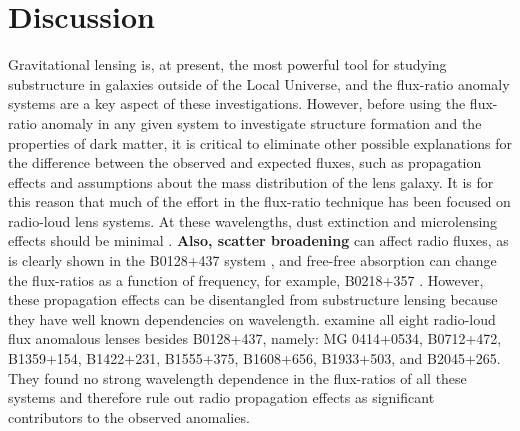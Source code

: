 \documentclass[useAMS,usenatbib]{mn2e}
\begin{document}
\section{Discussion}

Gravitational lensing is, at present, the most powerful tool for
studying substructure in galaxies outside of the Local Universe, and
the flux-ratio anomaly systems are a key aspect of these
investigations.  However, before using the flux-ratio anomaly in any
given system to investigate structure formation and the properties of
dark matter, it is critical to eliminate other possible explanations
for the difference between the observed and expected fluxes, such as
propagation effects and assumptions about the mass distribution of the
lens galaxy.  It is for this reason that much of the effort in the
flux-ratio technique has been focused on radio-loud lens systems.  At
these wavelengths, dust extinction and microlensing effects should be
minimal \citep[although see][for a rare example of radio
  microlensing]{K2000}.  \textbf{Also,  scatter broadening} can affect radio
fluxes, as is clearly shown in the B0128+437 system \citep{B04}, and free-free absorption can change the flux-ratios as a function of frequency,
for example, B0218+357 \citep{M07}.
However, these propagation effects can be disentangled from
substructure lensing because they have well known dependencies on
wavelength. \citet{KD04} examine all eight radio-loud flux anomalous
lenses besides B0128+437, namely: MG 0414+0534, B0712+472, B1359+154,
B1422+231, B1555+375, B1608+656, B1933+503, and B2045+265.  They found
no strong wavelength dependence in the flux-ratios of all these
systems and therefore rule out radio propagation effects as
significant contributors to the observed anomalies.
\end{document}
